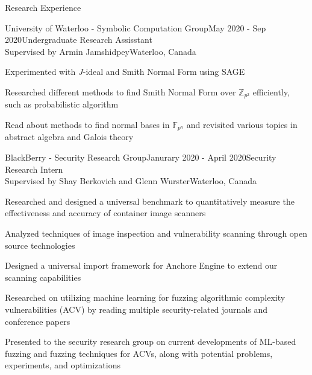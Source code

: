 \documentclass{cv}
\begin{document}
\begin{rSection}{Research Experience}
\begin{rSubsection}{University of Waterloo - Symbolic Computation Group}{May 2020 - Sep 2020}{Undergraduate Research Assisstant \\ Supervised by Armin Jamshidpey}{Waterloo, Canada}
	\item Experimented with $J$-ideal and Smith Normal Form using SAGE
  	\item Researched different methods to find Smith Normal Form over $\mathbb{Z}_{p^2}$ efficiently, such as probabilistic algorithm
  	\item Read about methods to find normal bases in $\mathbb{F}_{p^n}$ and revisited various topics in abstract algebra and Galois theory
\end{rSubsection}

\begin{rSubsection}{BlackBerry - Security Research Group}{Janurary 2020 - April 2020}{Security Research Intern \\ Supervised by Shay Berkovich and Glenn Wurster}{Waterloo, Canada}
	\item Researched and designed a universal benchmark to quantitatively measure the effectiveness and accuracy of container image scanners
	\item Analyzed techniques of image inspection and vulnerability scanning through open source technologies
	\item Designed a universal import framework for Anchore Engine to extend our scanning capabilities
	\item Researched on utilizing machine learning for fuzzing algorithmic complexity vulnerabilities (ACV) by reading multiple security-related journals and conference papers
	\item Presented to the security research group on current developments of ML-based fuzzing and fuzzing techniques for ACVs, along with potential problems, experiments, and optimizations
\end{rSubsection}
\end{rSection}
\end{document}
